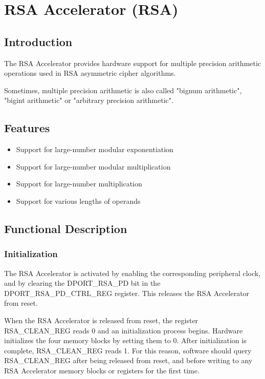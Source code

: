\documentclass[main\_\_EN.tex]{subfiles}
\begin{document}
\hypertarget{rsa}{}
\chapter{RSA Accelerator (RSA)}
\label{mod:rsa}

\section{Introduction}

The RSA Accelerator provides hardware support for multiple precision arithmetic operations used in RSA asymmetric cipher algorithms.

Sometimes, multiple precision arithmetic is also called "bignum arithmetic", "bigint arithmetic" or "arbitrary precision arithmetic".

\section{Features}

\begin{itemize}
    \item Support for large-number modular exponentiation
    \item Support for large-number modular multiplication
    \item Support for large-number multiplication
    \item Support for various lengths of operands
\end{itemize}


\section{Functional Description}

\subsection{Initialization}

The RSA Accelerator is activated by enabling the corresponding peripheral clock, and by clearing the DPORT\_RSA\_PD bit in the DPORT\_RSA\_PD\_CTRL\_REG register. This releases the RSA Accelerator from reset.

When the RSA Accelerator is released from reset, the register RSA\_CLEAN\_REG reads 0 and an initialization process begins. Hardware initializes the four memory blocks by setting them to 0. After initialization is complete, RSA\_CLEAN\_REG reads 1. For this reason, software should query RSA\_CLEAN\_REG after being released from reset, and before writing to any RSA Accelerator memory blocks or registers for the first time.
\end{document}

